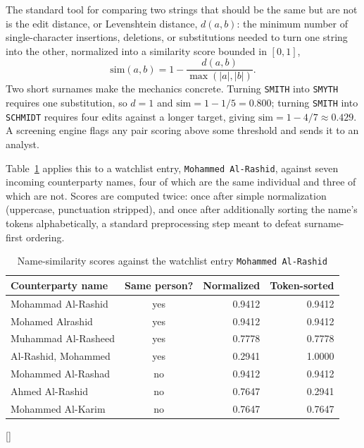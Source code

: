 \documentclass[../ai_in_finance]{subfiles}
\begin{document}
The standard tool for comparing two strings that should be the same but are not is the edit distance, or Levenshtein distance, $d(a,b)$: the minimum number of single-character insertions, deletions, or substitutions needed to turn one string into the other, normalized into a similarity score bounded in $[0,1]$,
\begin{equation*}
\text{sim}(a,b) = 1 - \frac{d(a,b)}{\max(|a|,|b|)}.
\end{equation*}
Two short surnames make the mechanics concrete. Turning \texttt{SMITH} into \texttt{SMYTH} requires one substitution, so $d=1$ and $\text{sim} = 1 - 1/5 = 0.800$; turning \texttt{SMITH} into \texttt{SCHMIDT} requires four edits against a longer target, giving $\text{sim} = 1 - 4/7 \approx 0.429$. A screening engine flags any pair scoring above some threshold and sends it to an analyst.

Table~\ref{tab:sanctions_matching} applies this to a watchlist entry, \texttt{Mohammed Al-Rashid}, against seven incoming counterparty names, four of which are the same individual and three of which are not. Scores are computed twice: once after simple normalization (uppercase, punctuation stripped), and once after additionally sorting the name's tokens alphabetically, a standard preprocessing step meant to defeat surname-first ordering.

\begin{table}[htbp]
\centering
\begin{lrbox}{\bookmeasuredbox}
\begin{tabular}{lcrr}
\toprule
Counterparty name & Same person? & Normalized & Token-sorted \\
\midrule
Mohammad Al-Rashid  & yes & 0.9412 & 0.9412 \\
Mohamed Alrashid    & yes & 0.9412 & 0.9412 \\
Muhammad Al-Rasheed & yes & 0.7778 & 0.7778 \\
Al-Rashid, Mohammed & yes & 0.2941 & 1.0000 \\
Mohammed Al-Rashad  & no  & 0.9412 & 0.9412 \\
Ahmed Al-Rashid     & no  & 0.7647 & 0.2941 \\
Mohammed Al-Karim   & no  & 0.7647 & 0.7647 \\
\bottomrule
\end{tabular}
\end{lrbox}
\ifdim\wd\bookmeasuredbox<0.65\linewidth
\setlength{\bookcapwidth}{0.65\linewidth}
\else
\setlength{\bookcapwidth}{\wd\bookmeasuredbox}
\fi
{}[\bookcapwidth]{
\usebox{\bookmeasuredbox}
}{
\caption{Name-similarity scores against the watchlist entry \texttt{Mohammed Al-Rashid}}
\label{tab:sanctions_matching}
}
\end{table}
\end{document}
